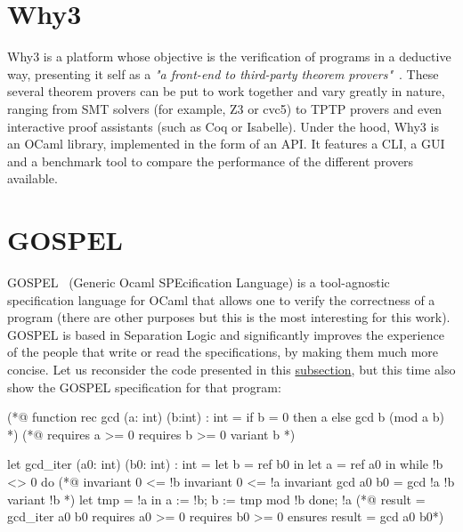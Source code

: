 \section{Why3}
\label{sec:why3}

Why3 is a platform whose objective is the verification of programs in a deductive way, presenting it self as a \emph{"a front-end to third-party theorem provers"}~\cite{why3}.
These several theorem provers can be put to work together and vary greatly in nature, ranging from SMT solvers (for example, Z3 or cvc5) to TPTP provers and even interactive proof assistants (such as Coq or Isabelle).
Under the hood, Why3 is an OCaml library, implemented in the form of an API.
It features a CLI, a GUI and a benchmark tool to compare the performance of the different provers available.


\section{GOSPEL}
\label{sec:gospel}

GOSPEL~\cite{DBLP:conf/fm/ChargueraudFLP19} (Generic Ocaml SPEcification Language) is a tool-agnostic specification language for OCaml that allows one to verify the correctness of a program (there are other purposes but this is the most interesting for this work).
GOSPEL is based in Separation Logic and significantly improves the experience of the people that write or read the specifications, by making them much more concise.
Let us reconsider the code presented in this \hyperref[sub:examples_ocaml]{subsection}, but this time also show the GOSPEL specification for that program:

\begin{gospel}
  (*@ function rec gcd (a: int) (b:int) : int =
      if b = 0 then a
      else gcd b (mod a b) *)
  (*@ requires a >= 0
      requires b >= 0
      variant b *)
\end{gospel}

\begin{gospel}
  let gcd_iter (a0: int) (b0: int) : int =
    let b = ref b0 in
    let a = ref a0 in
    while !b <> 0 do
        (*@ invariant 0 <= !b
            invariant 0 <= !a
            invariant gcd a0 b0 = gcd !a !b
            variant !b *)
        let tmp = !a in
        a := !b;
        b := tmp mod !b
    done;
    !a
  (*@ result = gcd_iter a0 b0
      requires a0 >= 0
      requires b0 >= 0
      ensures result = gcd a0 b0*)
\end{gospel}

